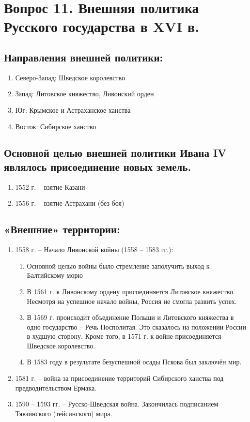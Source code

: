 
\section{Вопрос 11. Внешняя политика Русского государства в XVI в.}

\subsection{Направления внешней политики:}

\begin{enumerate}
    \item{ Северо-Запад: Шведское королевство }
    \item{ Запад: Литовское княжество, Ливонский орден }
    \item{ Юг: Крымское и Астраханское ханства }
    \item{ Восток: Сибирское ханство }
\end{enumerate}

\subsection{Основной целью внешней политики Ивана IV являлось присоединение новых земель.}

\begin{enumerate}
    \item{ 1552 г. – взятие Казани }
    \item{ 1556 г. – взятие Астрахани (без боя) }
\end{enumerate} 

\subsection{«Внешние» территории:}

\begin{enumerate}
    \item{ 1558 г. – Начало Ливонской войны (1558 – 1583 гг.):
        \begin{enumerate}
            \item{ Основной целью войны было стремление заполучить выход к Балтийскому морю }
            \item{ В 1561 г. к Ливонскому ордену присоединяется Литовское княжество. Несмотря на успешное начало войны, Россия не смогла развить успех. }
            \item{ В 1569 г. происходит объединение Польши и Литовского княжества в одно государство – Речь Посполитая. Это сказалось на положении России в худшую сторону. Кроме того, в 1571 г. к войне присоединяется Шведское королевство.  }
            \item{ В 1583 году в результате безуспешной осады Пскова был заключён мир. }
        \end{enumerate}
        }
    \item{ 1581 г. – война за присоединение территорий Сибирского ханства под предводительством Ермака. }
    \item{ 1590 – 1593 гг. – Русско-Шведская война. Закончилась подписанием Тявзинского (тейсинского) мира. }
\end{enumerate}

